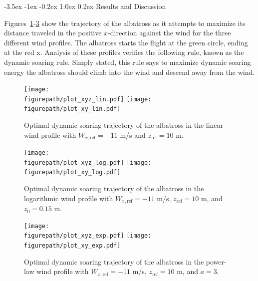 \documentclass[11pt,letterpaper,onecolumn]{article}
\makeatletter
\newcommand{\figurepath}{../fig/term-project}
\renewcommand\section{\@startsection{section}{1}{\z@}%
 {-3.5ex \@plus-1ex \@minus-0.2ex}%
 {1.0ex \@plus0.2ex}%
 {\fontsize{12pt}{12pt}\selectfont\bfseries\sffamily}}
\makeatother
\begin{document}
\section{Results and Discussion}\label{sec.results}

Figures~\ref{fig.xyzplot_lin}-\ref{fig.xyzplot_exp} show the trajectory of the albatross as it attempts to maximize its distance traveled in the positive $x$-direction against the wind for the three different wind profiles.
The albatross starts the flight at the green circle, ending at the red x.
Analysis of these profiles verifies the following rule, known as the dynamic soaring rule.
Simply stated, this rule says to maximize dynamic soaring energy the albatross should climb into the wind and descend away from the wind.

\begin{figure}[H]
  \begin{center}
    \texttt{[image: \\figurepath/plot\_xyz\_lin.pdf]}
    \texttt{[image: \\figurepath/plot\_xy\_lin.pdf]}
    \caption{Optimal dynamic soaring trajectory of the albatross in the linear wind profile with $W_{x,\text{ref}}=-11$ m/s and $z_{\text{ref}}=10$ m.\label{fig.xyzplot_lin}}
  \end{center}
\end{figure}

\begin{figure}[H]
  \begin{center}
    \texttt{[image: \\figurepath/plot\_xyz\_log.pdf]}
    \texttt{[image: \\figurepath/plot\_xy\_log.pdf]}
    \caption{Optimal dynamic soaring trajectory of the albatross in the logarithmic wind profile with $W_{x,\text{ref}}=-11$ m/s, $z_{\text{ref}}=10$ m, and $z_{0}=0.15$ m.\label{fig.xyzplot_log}}
  \end{center}
\end{figure}

\begin{figure}[H]
  \begin{center}
    \texttt{[image: \\figurepath/plot\_xyz\_exp.pdf]}
    \texttt{[image: \\figurepath/plot\_xy\_exp.pdf]}
    \caption{Optimal dynamic soaring trajectory of the albatross in the power-law wind profile with $W_{x,\text{ref}}=-11$ m/s, $z_{\text{ref}}=10$ m, and $a=3$.\label{fig.xyzplot_exp}}
  \end{center}
\end{figure}
\end{document}

